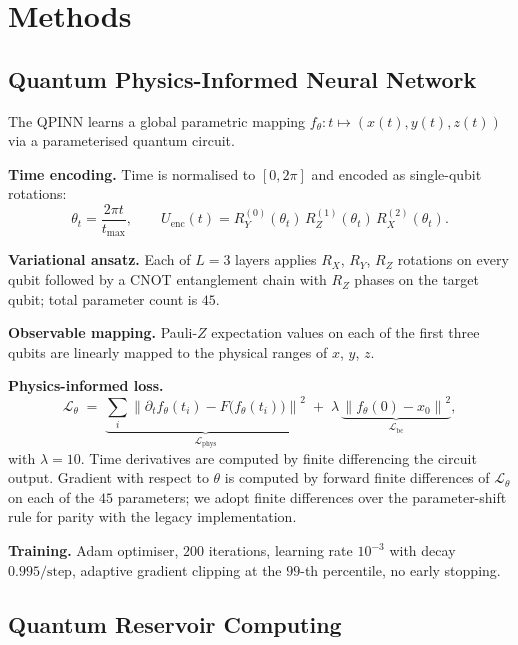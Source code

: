 \documentclass[11pt,a4paper]{article}
\newcommand{\norm}[1]{\left\lVert#1\right\rVert}
\begin{document}
\section{Methods}

\subsection{Quantum Physics-Informed Neural Network}

The QPINN learns a global parametric mapping
$f_\theta : t \mapsto (x(t), y(t), z(t))$ via a parameterised quantum
circuit.

\textbf{Time encoding.} Time is normalised to $[0, 2\pi]$ and encoded
as single-qubit rotations:
\begin{equation}
  \theta_t = \frac{2\pi t}{t_{\max}},
  \qquad
  U_{\mathrm{enc}}(t) = R_Y^{(0)}(\theta_t) \, R_Z^{(1)}(\theta_t) \, R_X^{(2)}(\theta_t).
\end{equation}

\textbf{Variational ansatz.} Each of $L = 3$ layers applies $R_X$, $R_Y$,
$R_Z$ rotations on every qubit followed by a CNOT entanglement chain
with $R_Z$ phases on the target qubit; total parameter count is $45$.

\textbf{Observable mapping.} Pauli-$Z$ expectation values on each of
the first three qubits are linearly mapped to the physical ranges of
$x$, $y$, $z$.

\textbf{Physics-informed loss.}
\begin{equation}
  \mathcal{L}_\theta
  \;=\;
  \underbrace{\sum_i \norm{ \partial_t f_\theta(t_i) - F\bigl(f_\theta(t_i)\bigr) }^2}_{\mathcal{L}_{\mathrm{phys}}}
  \;+\;
  \lambda \, \underbrace{\norm{ f_\theta(0) - x_0 }^2}_{\mathcal{L}_{\mathrm{bc}}},
\end{equation}
with $\lambda = 10$. Time derivatives are computed by finite
differencing the circuit output. Gradient with respect to $\theta$ is
computed by forward finite differences of $\mathcal{L}_\theta$ on each
of the $45$ parameters; we adopt finite differences over the
parameter-shift rule for parity with the legacy implementation.

\textbf{Training.} Adam optimiser, $200$ iterations, learning rate
$10^{-3}$ with decay $0.995/\mathrm{step}$, adaptive gradient
clipping at the $99$-th percentile, no early stopping.

\subsection{Quantum Reservoir Computing}
\end{document}
